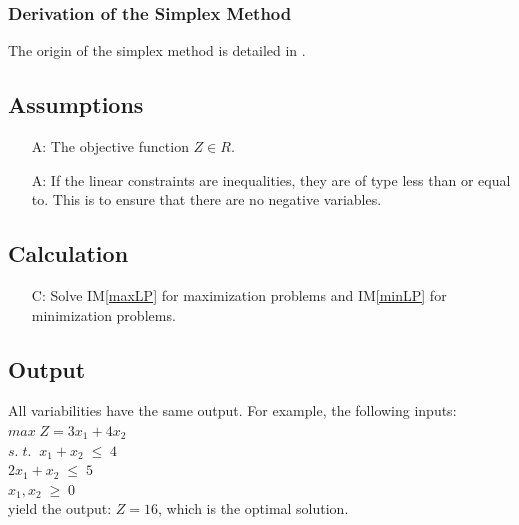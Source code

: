 \documentclass[12pt]{article}
\newcounter{assumpnum} %
\newcounter{calcnum} %
\newcommand{\iref}[1]{IM\ref{#1}}
\newcounter{lcnum} %
\begin{document}

\subsubsection*{Derivation of the Simplex Method}{
	The origin of the simplex method is detailed in \cite{simplex-origin}. 
}

\subsection{Assumptions}

\begin{itemize}
	\item[A\refstepcounter{assumpnum}\theassumpnum \label{A_objFunSpace}:] The 
	objective function $Z \in R$.
	
	\item[A\refstepcounter{assumpnum}\theassumpnum \label{A_inequalities}:] If 
	the linear constraints are inequalities, they are of type less than or 
	equal to. This is to ensure that there are no negative variables.
\end{itemize}

\subsection{Calculation} \label{sec_Calculation}

\begin{itemize}
	\item[C\refstepcounter{calcnum}\thecalcnum \label{calculation}:] Solve 
	\iref{maxLP} for maximization problems and \iref{minLP} for minimization 
	problems.
\end{itemize}


\subsection{Output} \label{sec_Output}

All variabilities have the same output. For example, the following inputs:\\
$max\;Z = 3x_1 + 4x_2$\\ \hspace{10mm}
\indent $s.\;t.\;\;x_1 + x_2\;\leq\;4$\\
\indent \indent $2x_1 + x_2\;\leq\;5$\\
\indent \indent $x_1, x_2\;\geq\;0$\\
yield the output: $Z = 16$, which is the optimal solution.
\end{document}
